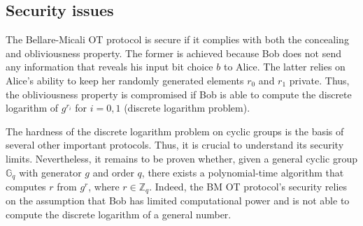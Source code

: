\subsection{Security issues}

The Bellare-Micali OT protocol is secure if it complies with both the concealing and obliviousness property. The former is achieved because Bob does not send any information that reveals his input bit choice $b$ to Alice. The latter relies on Alice's ability to keep her randomly generated elements $r_0$ and $r_1$ private. Thus, the obliviousness property is compromised if Bob is able to compute the discrete logarithm of $g^{r_i}$ for $i=0,1$ (discrete logarithm problem).

The hardness of the discrete logarithm problem on cyclic groups is the basis of several other important protocols. Thus, it is crucial to understand its security limits. Nevertheless, it remains to be proven whether, given a general cyclic group $ \mathbb{G}_q$ with generator $g$ and order $q$, there exists a polynomial-time algorithm that computes $r$ from $g^r$, where $r\in \mathbb{Z}_q$. Indeed, the BM OT protocol's security relies on the assumption that Bob has limited computational power and is not able to compute the discrete logarithm of a general number.

